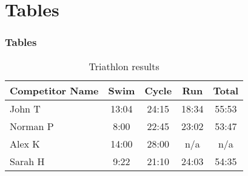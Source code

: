 \section{Tables}
\label{tables}
\begin{frame}\frametitle{Tables}
  \begin{table}
    \begin{tabular}{l | c | c | c | c }
      Competitor Name & Swim & Cycle & Run & Total \\
      \hline \hline
      John T & 13:04 & 24:15 & 18:34 & 55:53 \\ 
      Norman P & 8:00 & 22:45 & 23:02 & 53:47\\
      Alex K & 14:00 & 28:00 & n/a & n/a\\
      Sarah H & 9:22 & 21:10 & 24:03 & 54:35 
    \end{tabular}
    \caption{Triathlon results}
  \end{table}
\end{frame}